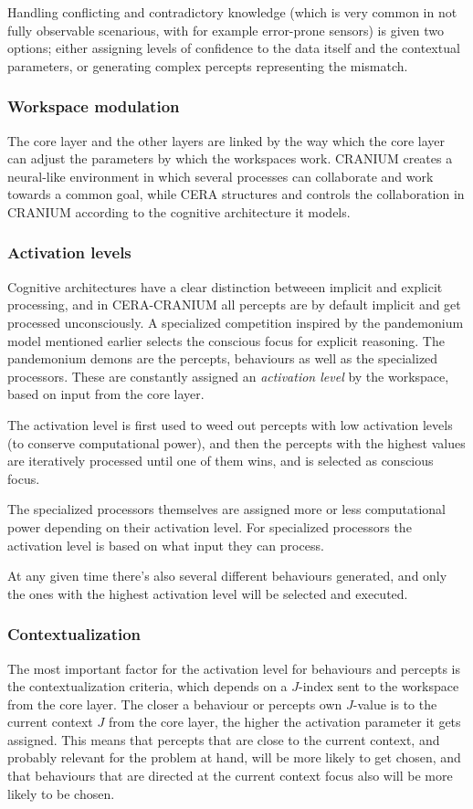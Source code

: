 Handling conflicting and contradictory knowledge (which is very common in not
fully observable scenarious, with for example error-prone sensors) is given two
options; either assigning levels of confidence to the data itself and the
contextual parameters, or generating complex percepts representing the mismatch.

\subsubsection{Workspace modulation}
The core layer and the other layers are linked by the way which the
core layer can adjust the parameters by which the workspaces work. CRANIUM
creates a neural-like environment in which several processes can collaborate
and work towards a common goal, while CERA structures and controls the
collaboration in CRANIUM according to the cognitive architecture it models.

\subsubsection{Activation levels}
Cognitive architectures have a clear distinction betweeen implicit and explicit
processing\cite{atkinson2000consciousness}, and in CERA-CRANIUM all percepts
are by default implicit and get processed unconsciously. A specialized
competition inspired by the pandemonium model mentioned earlier selects the
conscious focus for explicit reasoning. The pandemonium demons are the
percepts, behaviours as well as the specialized processors. These are
constantly assigned an \textit{activation level} by the workspace, based on
input from the core layer.

The activation level is first used to weed out percepts with low activation
levels (to conserve computational power), and then the percepts with the highest
values are iteratively processed until one of them wins, and is selected as
conscious focus.

The specialized processors themselves are assigned more or less computational
power depending on their activation level. For specialized processors the
activation level is based on what input they can process.

At any given time there's also several different behaviours generated, and only
the ones with the highest activation level will be selected and executed.

\subsubsection{Contextualization}
The most important factor for the activation level for behaviours and percepts
is the contextualization criteria, which depends on a $J$-index sent to the
workspace from the core layer. The closer a behaviour or percepts own $J$-value
is to the current context $J$ from the core layer, the higher the activation
parameter it gets assigned. This means that percepts that are close to the
current context, and probably relevant for the problem at hand, will be more
likely to get chosen, and that behaviours that are directed at the current
context focus also will be more likely to be chosen.

